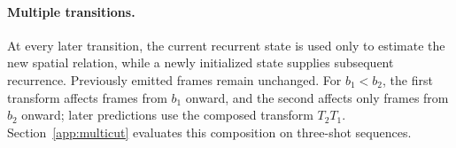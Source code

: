 \paragraph{Multiple transitions.}
At every later transition, the current recurrent state is used only to
estimate the new spatial relation, while a newly initialized state supplies
subsequent recurrence. Previously emitted frames remain unchanged. For
$b_1<b_2$, the first transform affects frames from $b_1$ onward, and the
second affects only frames from $b_2$ onward; later predictions use the
composed transform $T_2T_1$. Section~\ref{app:multicut} evaluates this
composition on three-shot sequences.
